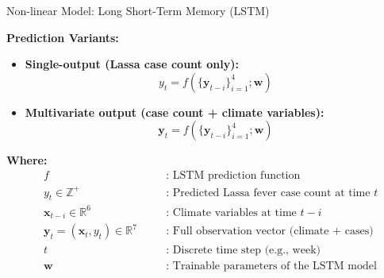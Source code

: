 \documentclass{beamer}
\begin{document}
\begin{frame}{Non-linear Model: Long Short-Term Memory (LSTM)}

\textbf{Prediction Variants:}
\begin{itemize}
    \item \textbf{Single-output (Lassa case count only):}
    \[
    y_t = f\left( \{\mathbf{y}_{t-i}\}_{i=1}^{4}; \mathbf{w} \right)
    \]
    
    \item \textbf{Multivariate output (case count + climate variables):}
    \[
    \mathbf{y}_t = f\left( \{\mathbf{y}_{t-i}\}_{i=1}^{4}; \mathbf{w} \right)
    \]
\end{itemize}

\vspace{0.5em}
\small
\textbf{Where:}
\begin{align*}
    & f \quad && \text{: LSTM prediction function} \\
    & y_t \in \mathbb{Z}^+ \quad && \text{: Predicted Lassa fever case count at time } t \\
    & \mathbf{x}_{t-i} \in \mathbb{R}^6 \quad && \text{: Climate variables at time } t-i \\
    & \mathbf{y}_t = (\mathbf{x}_t, y_t) \in \mathbb{R}^7 \quad && \text{: Full observation vector (climate + cases)} \\
    & t \quad && \text{: Discrete time step (e.g., week)} \\
    & \mathbf{w} \quad && \text{: Trainable parameters of the LSTM model}
\end{align*}

\end{frame}
\end{document}
